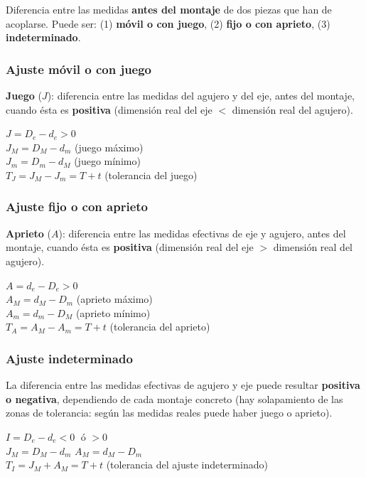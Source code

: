 \documentclass[12pt,a4paper]{article}
\begin{document}
\begin{defi}[Ajuste]
	Diferencia entre las medidas \textbf{antes del montaje} de dos piezas que han
	de acoplarse. Puede ser: (1) \textbf{móvil o con juego}, (2) \textbf{fijo o
		con
		aprieto}, (3) \textbf{indeterminado}.
\end{defi}

\subsubsection{Ajuste móvil o con juego}
\textbf{Juego} ($J$): diferencia entre las medidas del agujero y del eje, antes
del montaje, cuando ésta es \textbf{positiva} (dimensión real del eje $<$
dimensión real del agujero).
\begin{formu}
	$J = D_e - d_e > 0$\\
	$J_M = D_M - d_m$ (juego máximo)\\
	$J_m = D_m - d_M$ (juego mínimo)\\
	$T_J = J_M - J_m = T + t$ (tolerancia del juego)
\end{formu}

\subsubsection{Ajuste fijo o con aprieto}
\textbf{Aprieto} ($A$): diferencia entre las medidas efectivas de eje y agujero,
antes del montaje, cuando ésta es \textbf{positiva} (dimensión real del eje $>$
dimensión real del agujero).
\begin{formu}
	$A = d_e - D_e > 0$\\
	$A_M = d_M - D_m$ (aprieto máximo)\\
	$A_m = d_m - D_M$ (aprieto mínimo)\\
	$T_A = A_M - A_m = T + t$ (tolerancia del aprieto)
\end{formu}

\subsubsection{Ajuste indeterminado}
La diferencia entre las medidas efectivas de agujero y eje puede resultar
\textbf{positiva o negativa}, dependiendo de cada montaje concreto (hay
solapamiento de las zonas de tolerancia: según las medidas reales puede haber
juego o aprieto).
\begin{formu}
	$I = D_e - d_e < 0 \;\text{ ó } > 0$\\
	$J_M = D_M - d_m$ \qquad $A_M = d_M - D_m$\\
	$T_I = J_M + A_M = T + t$ (tolerancia del ajuste indeterminado)
\end{formu}
\end{document}
